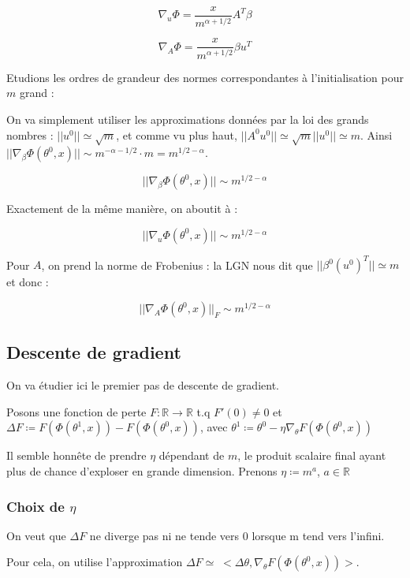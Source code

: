 \documentclass[a4paper, 11pt, french]{article}
\theoremstyle{definition}
\begin{document}
	\[\nabla_u \Phi = \frac{x}{m^{\alpha + 1/2}} A^T \beta\]

	\[\nabla_A \Phi = \frac{x}{m^{\alpha + 1/2}} \beta u^T\]
	
	Etudions les ordres de grandeur des normes correspondantes à l'initialisation pour $m$ grand :
	
	On va simplement utiliser les approximations données par la loi des grands nombres :
	 $||u^0|| \simeq \sqrt{m}$, et comme vu plus haut, 
	 $||A^0 u^0|| \simeq \sqrt{m}||u^0|| \simeq m$. Ainsi $||\nabla_{\beta} \Phi (\theta^0, x)|| \sim m^{-\alpha - 1/2} \cdot m = m^{1/2 - \alpha}$.
	 
	 \[||\nabla_{\beta} \Phi (\theta^0, x)|| \sim m^{1/2 - \alpha}\]
	 
	 Exactement de la même manière, on aboutit à :
	 
	 \[||\nabla_u \Phi (\theta^0, x)|| \sim m^{1/2 - \alpha}\]
	 
	 Pour $A$, on prend la norme de Frobenius : la LGN nous dit que $||\beta^0 (u^0)^T|| \simeq m$ et donc :
	 
	 \[||\nabla_A \Phi (\theta^0, x)||_F \sim m^{1/2 - \alpha}\]
	 
	 \subsection{Descente de gradient}
	 
	 On va étudier ici le premier pas de descente de gradient.
	 
	 Posons une fonction de perte $F : \mathbb{R} \rightarrow \mathbb{R}$ t.q $F'(0) \neq 0$ et 
	 $\Delta F \coloneqq F(\Phi(\theta^1, x)) - F(\Phi(\theta^0, x))$, avec 
	 $\theta^1 \coloneqq \theta^0 - \eta \nabla_{\theta} F(\Phi(\theta^0, x))$
	 
	 Il semble honnête de prendre $\eta$ dépendant de $m$, le produit scalaire final ayant plus de chance d'exploser en grande dimension. Prenons $\eta \coloneqq m^a$, $a \in \mathbb{R}$ \\
	 
	 \subsubsection{Choix de $\eta$}
	 
	 On veut que $\Delta F$ ne diverge pas ni ne tende vers 0 lorsque m tend vers l'infini.
	 
	 Pour cela, on utilise l'approximation 
	 $\Delta F \simeq \; < \Delta \theta, \nabla_{\theta} F(\Phi(\theta^0, x)) >$.
	 
\end{document}
